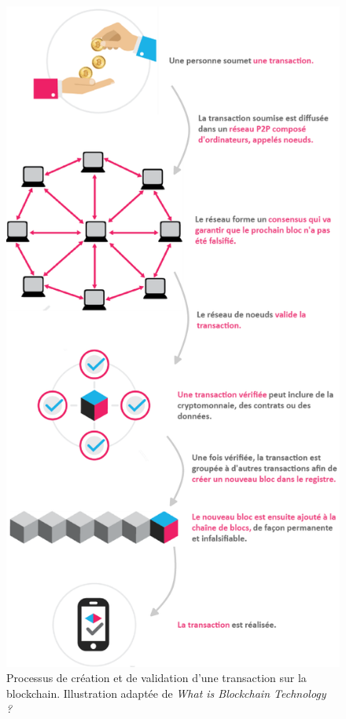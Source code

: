 \documentclass{tnreport}
\begin{document}
\begin{figure}[h]
	\centering
	\includegraphics[scale=0.45]{figures/blockchain-diagram}
	\caption{Processus de création et de validation d'une transaction sur la blockchain. Illustration adaptée de \textit{What is Blockchain Technology ?}~\cite{blockchain}}
	\label{fig:blockchain-diagram}
\end{figure}
\clearpage
\end{document}
